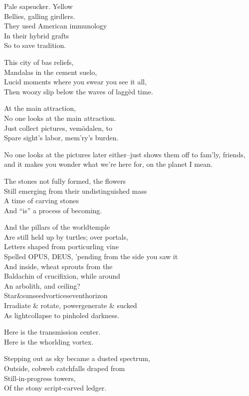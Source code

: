 
Pale sapsucker. Yellow \\
Bellies, galling girdlers. \\
They used American immunology \\
In their hybrid grafts \\
So to save tradition.

This city of bas reliefs, \\
Mandalas in the cement suelo, \\
Lucid moments where you swear you see it all, \\
Then woozy slip below the waves of laggèd time.

At the main attraction, \\
No one looks at the main attraction. \\
Just collect pictures, vemödalen, to \\
Spare sight's labor, mem'ry's burden. 

No one looks at the pictures later either--just shows them off to fam'ly, friends, and it makes you wonder what we're here for, on the planet I mean.

The stones not fully formed, the flowers \\
Still emerging from their undistinguished mass \\
A time of carving stones \\
And ``is'' a process of becoming.

And the pillars of the worldtemple \\
Are still held up by turtles; over portals, \\
Letters shaped from porticurling vine \\
Spelled OPUS, DEUS, 'pending from the side you saw it \\
And inside, wheat sprouts from the  \\
Baldachin of crucifixion, while around \\
An arbolith, and ceiling?  \\
Star\&sunseedvorticeseventhorizon \\
Irradiate \& rotate, powergenerate \& sucked \\
As lightcollapse to pinholed darkness.

Here is the transmission center. \\
Here is the whorlding vortex.

Stepping out as sky became a dusted spectrum, \\ 
Outside, cobweb catchfalls draped from \\
Still-in-progress towers, \\
Of the stony script-carved ledger.

